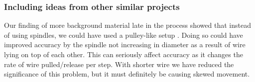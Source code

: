 \subsubsection{Including ideas from other similar projects}
Our finding of more background material late in the process showed that instead of using spindles, we could have used a pulley-like setup \citep{Vimio:2010:DrawingMachine}. Doing so could have improved accuracy by the spindle not increasing in diameter as a result of wire lying on top of each other. This can seriously affect accuracy as it changes the rate of wire pulled/release per step. With shorter wire we have reduced the significance of this problem, but it must definitely be causing skewed movement. 